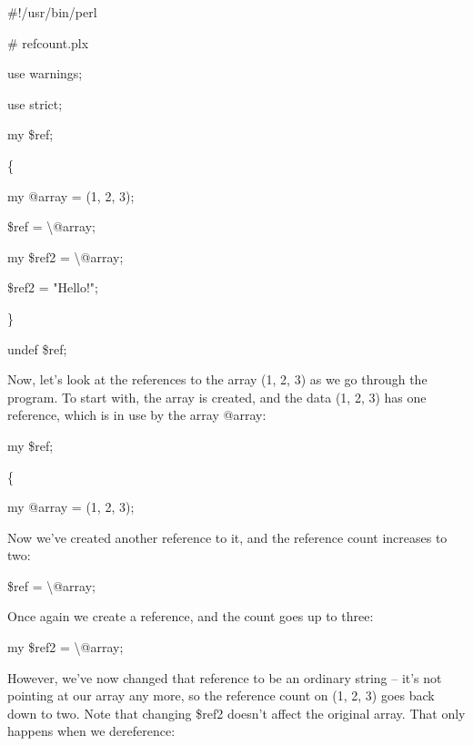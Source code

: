 \documentclass[a4paper,11pt]{book}
\begin{document}
\noindent 

\noindent 

\noindent \#!/usr/bin/perl

\noindent \# refcount.plx

\noindent use warnings;

\noindent use strict;

\noindent 

\noindent my \$ref;

\noindent \{

\noindent my @array = (1, 2, 3);

\noindent \$ref = \textbackslash @array;

\noindent my \$ref2 = \textbackslash @array;

\noindent \$ref2 = "Hello!";

\noindent \}

\noindent undef \$ref;

\noindent 

\noindent Now, let's look at the references to the array (1, 2, 3) as we go through the program. To start with, the array is created, and the data (1, 2, 3) has one reference, which is in use by the array @array:

\noindent 

\noindent my \$ref;

\noindent \{

\noindent my @array = (1, 2, 3);

\noindent 

\noindent Now we've created another reference to it, and the reference count increases to two:

\noindent 

\noindent 

\noindent \$ref = \textbackslash @array;

\noindent 

\noindent Once again we create a reference, and the count goes up to three:

\noindent 

\noindent 

\noindent my \$ref2 = \textbackslash @array;

\noindent 

\noindent However, we've now changed that reference to be an ordinary string -- it's not pointing at our array any more, so the reference count on (1, 2, 3) goes back down to two. Note that changing \$ref2 doesn't affect the original array. That only happens when we dereference:
\end{document}
